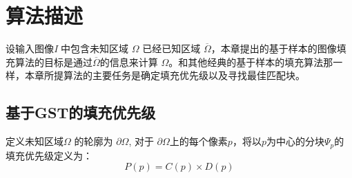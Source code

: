  \section{算法描述}
 \label{algorithm}
 设输入图像\emph{I} 中包含未知区域 \(\Omega\) 已经已知区域 \(\overline{\Omega}\)，本章提出的基于样本的图像填充算法的目标是通过\(\overline{\Omega}\)的信息来计算 \(\Omega\)。和其他经典的基于样本的填充算法那一样，本章所提算法的主要任务是确定填充优先级以及寻找最佳匹配块。
 \subsection{基于GST的填充优先级}
 \label{sec:sub:GST}

 定义未知区域\(\Omega\) 的轮廓为 \(\partial\Omega\), 对于 \(\partial\Omega\)上的每个像素\(p\)，将以\(p\)为中心的分块\(\Psi_p\)的填充优先级定义为：
 \begin{equation}
    \label{equ:chap3:order}
    P(p)=C(p)\times D(p)
 \end{equation}

